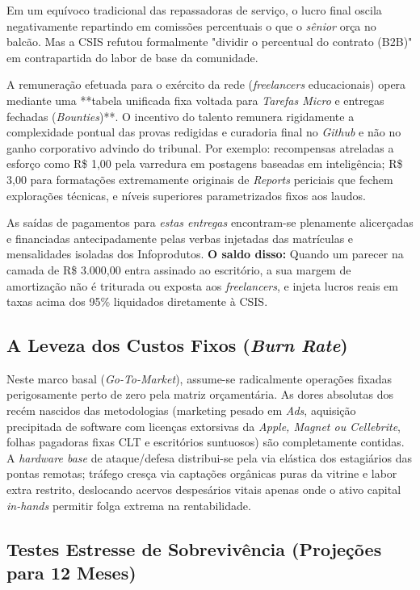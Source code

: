 \documentclass[../main.tex]{subfiles}
\begin{document}
Em um equívoco tradicional das repassadoras de serviço, o lucro final oscila negativamente repartindo em comissões percentuais o que o \textit{sênior} orça no balcão. Mas a CSIS refutou formalmente "dividir o percentual do contrato (B2B)" em contrapartida do labor de base da comunidade. 

A remuneração efetuada para o exército da rede (\textit{freelancers} educacionais) opera mediante uma **tabela unificada fixa voltada para \textit{Tarefas Micro} e entregas fechadas (\textit{Bounties})**. O incentivo do talento remunera rigidamente a complexidade pontual das provas redigidas e curadoria final no \textit{Github} e não no ganho corporativo advindo do tribunal. Por exemplo: recompensas atreladas a esforço como R\$ 1,00 pela varredura em postagens baseadas em inteligência; R\$ 3,00 para formatações extremamente originais de \textit{Reports} periciais que fechem explorações técnicas, e níveis superiores parametrizados fixos aos laudos. 

As saídas de pagamentos para \textit{estas entregas} encontram-se plenamente alicerçadas e financiadas antecipadamente pelas verbas injetadas das matrículas e mensalidades isoladas dos Infoprodutos. \textbf{O saldo disso:} Quando um parecer na camada de R\$ 3.000,00 entra assinado ao escritório, a sua margem de amortização não é triturada ou exposta aos \textit{freelancers}, e injeta lucros reais em taxas acima dos 95\% liquidados diretamente à CSIS.

\subsection{A Leveza dos Custos Fixos (\textit{Burn Rate})}

Neste marco basal (\textit{Go-To-Market}), assume-se radicalmente operações fixadas perigosamente perto de zero pela matriz orçamentária. As dores absolutas dos recém nascidos das metodologias (marketing pesado em \textit{Ads}, aquisição precipitada de software com licenças extorsivas da \textit{Apple, Magnet ou Cellebrite}, folhas pagadoras fixas CLT e escritórios suntuosos) são completamente contidas. A \textit{hardware base} de ataque/defesa distribui-se pela via elástica dos estagiários das pontas remotas; tráfego cresça via captações orgânicas puras da vitrine e labor extra restrito, deslocando acervos despesários vitais apenas onde o ativo capital \textit{in-hands} permitir folga extrema na rentabilidade.

\subsection{Testes Estresse de Sobrevivência (Projeções para 12 Meses)}
\end{document}
